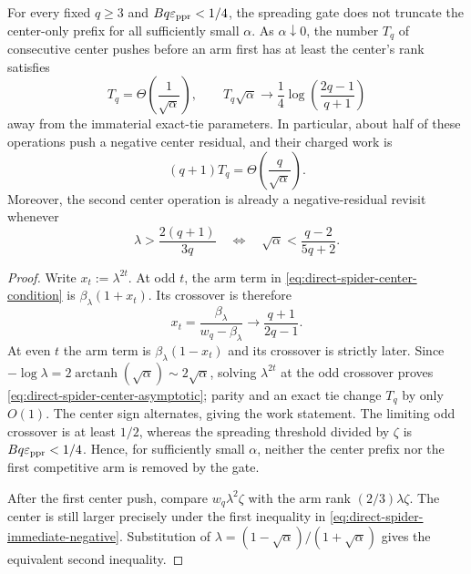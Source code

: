 \begin{corollary}
\label{cor:direct-spider-center-echo}
For every fixed $q\geq3$ and $Bq\varepsilon_{\mathrm{ppr}}<1/4$, the spreading gate does not
truncate the center-only prefix for all sufficiently small $\alpha$. As
$\alpha\downarrow0$, the number $T_q$ of consecutive center pushes before an
arm first has at least the center's rank satisfies
\begin{equation}
 T_q
 =\Theta\!\left(\frac1{\sqrt\alpha}\right),
 \qquad
 T_q\sqrt\alpha
 \longrightarrow
 \frac14\log\!\left(\frac{2q-1}{q+1}\right)
 \label{eq:direct-spider-center-asymptotic}
\end{equation}
away from the immaterial exact-tie parameters. In particular, about half of
these operations push a negative center residual, and their charged work is
\begin{equation}
 (q+1)T_q=\Theta\!\left(\frac q{\sqrt\alpha}\right).
 \label{eq:direct-spider-center-work}
\end{equation}
Moreover, the second center operation is already a negative-residual revisit
whenever
\begin{equation}
 \lambda>\frac{2(q+1)}{3q}
 \quad\Longleftrightarrow\quad
 \sqrt\alpha<\frac{q-2}{5q+2}.
 \label{eq:direct-spider-immediate-negative}
\end{equation}
\end{corollary}

\begin{proof}
Write $x_t:=\lambda^{2t}$. At odd $t$, the arm term in
\cref{eq:direct-spider-center-condition} is
$\beta_\lambda(1+x_t)$. Its crossover is therefore
\begin{equation*}
 x_t=\frac{\beta_\lambda}{w_q-\beta_\lambda}
 \longrightarrow\frac{q+1}{2q-1}.
\end{equation*}
At even $t$ the arm term is $\beta_\lambda(1-x_t)$ and its crossover is
strictly later. Since
$-\log\lambda=2\operatorname{arctanh}(\sqrt\alpha)
\sim2\sqrt\alpha$, solving $\lambda^{2t}$ at the odd crossover proves
\cref{eq:direct-spider-center-asymptotic}; parity and an exact tie change
$T_q$ by only $O(1)$. The center sign alternates, giving the work statement.
The limiting odd crossover is at least $1/2$, whereas the spreading threshold
divided by $\zeta$ is $Bq\varepsilon_{\mathrm{ppr}}<1/4$. Hence, for sufficiently small
$\alpha$, neither the center prefix nor the first competitive arm is removed
by the gate.

After the first center push, compare
$w_q\lambda^2\zeta$ with the arm rank
$(2/3)\lambda\zeta$. The center is still larger precisely under the first
inequality in \cref{eq:direct-spider-immediate-negative}. Substitution of
$\lambda=(1-\sqrt\alpha)/(1+\sqrt\alpha)$ gives the equivalent second
inequality.
\end{proof}


